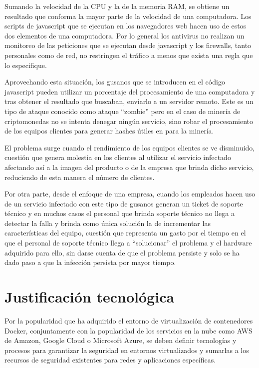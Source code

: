 \documentclass[../main/main.tex]{subfiles}
\begin{document}
  Sumando la velocidad de la CPU y la de la memoria RAM, se obtiene un resultado que conforma la mayor parte de la velocidad de una computadora. Los scripts de javascript que se ejecutan en los navegadores web hacen uso de estos dos elementos de una computadora. Por lo general los antivirus no realizan un monitoreo de las peticiones que se ejecutan desde javascript y los firewalls, tanto personales como de red, no restringen el tráfico a menos que exista una regla que lo especifique.

  Aprovechando esta situación, los gusanos que se introducen en el código javascript pueden utilizar un porcentaje del procesamiento de una computadora y tras obtener el resultado que buscaban, enviarlo a un servidor remoto. Este es un tipo de ataque conocido como ataque ``zombie'' pero en el caso de minería de criptomonedas no se intenta denegar ningún servicio, sino robar el procesamiento de los equipos clientes para generar hashes útiles en para la minería.

  El problema surge cuando el rendimiento de los equipos clientes se ve disminuido, cuestión que genera molestia en los clientes al utilizar el servicio infectado afectando así a la imagen del producto o de la empresa que brinda dicho servicio, reduciendo de esta manera el número de clientes.

  Por otra parte, desde el enfoque de una empresa, cuando los empleados hacen uso de un servicio infectado con este tipo de gusanos generan un ticket de soporte técnico y en muchos casos el personal que brinda soporte técnico no llega a detectar la falla y brinda como única solución la de incrementar las características del equipo, cuestión que representa un gasto por el tiempo en el que el personal de soporte técnico llega a ``solucionar'' el problema y el hardware adquirido para ello, sin darse cuenta de que el problema persiste y solo se ha dado paso a que la infección persista por mayor tiempo.

  \section{Justificación tecnológica}

  Por la popularidad que ha adquirido el entorno de virtualización de contenedores Docker, conjuntamente con la popularidad de los servicios en la nube como AWS de Amazon, Google Cloud o Microsoft Azure, se deben definir tecnologías y procesos para garantizar la seguridad en entornos virtualizados y sumarlas a los recursos de seguridad existentes para redes y aplicaciones específicas.
\end{document}
